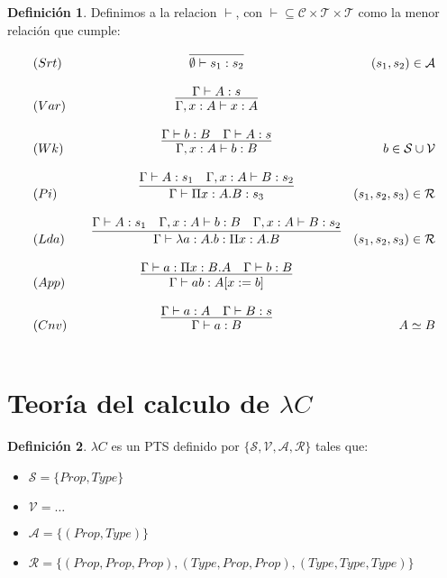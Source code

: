 \documentclass{article}
\theoremstyle{definition}
\newtheorem{definition}{Definición}[section]
\theoremstyle{remark}
\begin{document}
\begin{definition}Definimos a la relacion $\vdash$, con $\vdash \subseteq \mathcal{C}\times\mathcal{T}\times\mathcal{T}$ como
la menor relación que cumple:


\[
\begin{array}{llcr}
	(Srt) & &\infer{\emptyset \vdash s_{1} : s_{2}}{} & (s_{1},s_{2}) \in\mathcal{A} \\ \\
	(Var) & &\infer{\Gamma, x:A \vdash x:A}{\Gamma\vdash A:s} & \\ \\
	(Wk)  & &\infer{\Gamma, x:A \vdash b:B}{\Gamma\vdash b:B & \Gamma\vdash A:s} & b\in\mathcal{S}\cup\mathcal{V} \\ \\
	(Pi)  & &\infer{\Gamma \vdash \Pi x:A.B : s_{3}}{\Gamma\vdash A:s_{1} & \Gamma, x:A \vdash B:s_{2}} &  (s_1,s_2,s_3)\in\mathcal{R}\\ \\
	(Lda) & &\infer{\Gamma \vdash \lambda a:A.b : \Pi x:A.B }{\Gamma\vdash A:s_{1} & \Gamma, x:A \vdash b:B &\Gamma, x:A \vdash B:s_{2}} &  (s_1,s_2,s_3)\in\mathcal{R}\\ \\
	(App) & &\infer{\Gamma \vdash a b : A[x:= b] }{\Gamma\vdash a : \Pi x:B.A & \Gamma \vdash b:B} &  \\ \\
	(Cnv) & &\infer{\Gamma \vdash a:B}{\Gamma\vdash a:A & \Gamma\vdash B:s} & A \simeq B \\ \\
	
\end{array}
\]

\end{definition}




\section{Teoría del calculo de $\lambda C$ }

\begin{definition}
$\lambda C$ es un PTS definido por $\{ \mathcal{S}, \mathcal{V}, \mathcal{A}, \mathcal{R}\}$ tales que:

\begin{itemize}
    \item{} $\mathcal{S} = \{Prop,Type\}$
    \item{} $\mathcal{V} = \dots $
    \item{} $\mathcal{A} = \{(Prop, Type)\}$
    \item{} $\mathcal{R} = \{(Prop, Prop, Prop), (Type, Prop, Prop), (Type, Type, Type)\}$
\end{itemize}

\end{definition}
\end{document}
